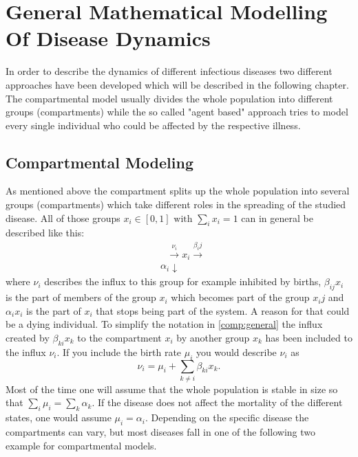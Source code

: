 \section{General Mathematical Modelling Of Disease Dynamics}
In order to describe the dynamics of different infectious diseases two different approaches have been developed which will be described in the following chapter.
The compartmental model usually divides the whole population into different groups (compartments) while the so called "agent based" approach tries to model every single individual who could be affected by the respective illness. 
\subsection{Compartmental Modeling}
As mentioned above the compartment splits up the whole population into several groups (compartments) which take different roles in the spreading of the studied disease.
All of those groups $x_i \in [0,1] \text{ with } \sum_i x_i =1 $ can in general be described like this:
\begin{eqnarray}
&\text{     }\xrightarrow{\nu_i}  x_i \xrightarrow{\beta_ij}   \label{comp:general} \\
&{\alpha_i} \downarrow  \nonumber
\end{eqnarray}
where $\nu_i$ describes the influx to this group for example inhibited by births, $\beta_{ij} x_i$ is the part of members of the group $x_i$ which becomes part of the group $x_ij$ and $\alpha_i x_i$ is the part of $x_i$ that stops being part of the system. A reason for that could be a dying individual. To simplify the notation in \ref{comp:general} the influx created by $\beta_{ki} x_k$ to the compartment $x_i$ by another group $x_k$ has been included to the influx $\nu_i$. If you include the birth rate $\mu_i$ you would describe $\nu_i$ as 
\begin{equation}
\nu_i = \mu_i + \sum_{k\neq i}{}\beta_{ki} x_k.
\end{equation}
Most of the time one will assume that the whole population is stable in size so that $\sum_i \mu_i = \sum_{k} \alpha_k$. If the disease does not affect the mortality of the different states, one would assume $\mu_i = \alpha_i$.
Depending on the specific disease the compartments can vary, but most diseases fall in one of the following two example for compartmental models.
